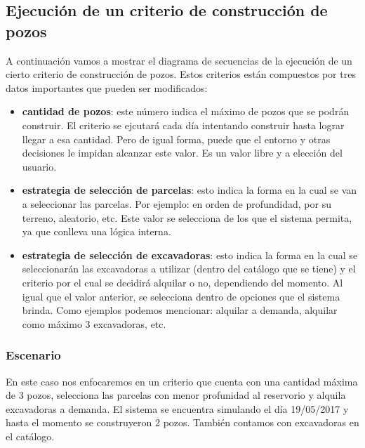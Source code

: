 \subsection{Ejecución de un criterio de construcción de pozos}

\par A continuación vamos a mostrar el diagrama de secuencias de la ejecución de un cierto criterio de construcción de pozos. Estos criterios están compuestos por tres datos importantes que pueden ser modificados:

\begin{itemize}
  \item \textbf{cantidad de pozos}: este número indica el máximo de pozos que se podrán construir. El criterio se ejcutará cada día intentando construir hasta lograr llegar a esa cantidad. Pero de igual forma, puede que el entorno y otras decisiones le impidan alcanzar este valor. Es un valor libre y a elección del usuario.
  \item \textbf{estrategia de selección de parcelas}: esto indica la forma en la cual se van a seleccionar las parcelas. Por ejemplo: en orden de profundidad, por su terreno, aleatorio, etc. Este valor se selecciona de los que el sistema permita, ya que conlleva una lógica interna.

  \item \textbf{estrategia de selección de excavadoras}: esto indica la forma en la cual se seleccionarán las excavadoras a utilizar (dentro del catálogo que se tiene) y el criterio por el cual se decidirá alquilar o no, dependiendo del momento. Al igual que el valor anterior, se selecciona dentro de opciones que el sistema brinda. Como ejemplos podemos mencionar: alquilar a demanda, alquilar como máximo 3 excavadoras, etc.
\end{itemize}

\subsubsection{Escenario}
\par En este caso nos enfocaremos en un criterio que cuenta con una cantidad máxima de 3 pozos, selecciona las parcelas con menor profunidad al reservorio y alquila excavadoras a demanda. El sistema se encuentra simulando el día 19/05/2017 y hasta el momento se construyeron 2 pozos. También contamos con excavadoras en el catálogo.

